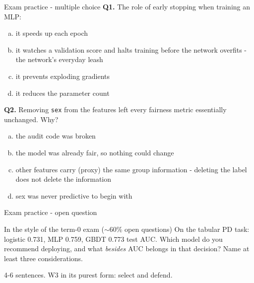 \documentclass[10pt,aspectratio=169]{beamer}
\begin{document}
\begin{frame}{Exam practice - multiple choice}
  \small
  \textbf{Q1.} The role of early stopping when training an MLP:
  \begin{enumerate}[(a)]
    \item it speeds up each epoch
    \item it watches a validation score and halts training before the
          network overfits - the network's everyday leash
    \item it prevents exploding gradients
    \item it reduces the parameter count
  \end{enumerate}
  \vspace{0.4em}
  \textbf{Q2.} Removing \texttt{sex} from the features left every fairness
  metric essentially unchanged. Why?
  \begin{enumerate}[(a)]
    \item the audit code was broken
    \item the model was already fair, so nothing could change
    \item other features carry (proxy) the same group information -
          deleting the label does not delete the information
    \item sex was never predictive to begin with
  \end{enumerate}
\end{frame}

\begin{frame}{Exam practice - open question}
  \begin{block}{In the style of the term-0 exam ($\sim$60\% open questions)}
    On the tabular PD task: logistic 0.731, MLP 0.759, GBDT 0.773 test AUC.
    Which model do you recommend deploying, and what \emph{besides} AUC
    belongs in that decision? Name at least three considerations.
  \end{block}
  \vspace{0.5em}
  \begin{center}\small
    4-6 sentences. W3 in its purest form: select and defend.
  \end{center}
\end{frame}
\end{document}
